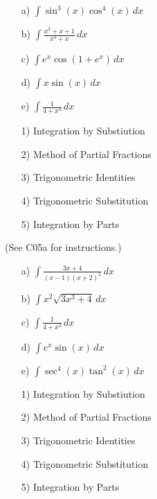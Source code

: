\documentclass[12pt]{article}
\begin{document}
\vspace{1em}

\begin{multicols}{2}
  \begin{itemize}
    \item[a)] \(\displaystyle\int \sin^3(x)\cos^4(x)\,dx\)
    \item[b)] \(\displaystyle\int \frac{x^2+x+1}{x^3+x}\,dx\)
    \item[c)] \(\displaystyle\int e^x\cos(1+e^x)\,dx\)
    \item[d)] \(\displaystyle\int x\sin(x)\,dx\)
    \item[e)] \(\displaystyle\int \frac{1}{4+x^2}\,dx\)
  \end{itemize}
  \columnbreak
  \begin{itemize}
    \item[1)] Integration by Substiution
    \item[2)] Method of Partial Fractions
    \item[3)] Trigonometric Identities
    \item[4)] Trigonometric Substitution
    \item[5)] Integration by Parts
  \end{itemize}
\end{multicols}

\newpage





(See C05a for instructions.)

\begin{multicols}{2}
  \begin{itemize}
    \item[a)] \(\displaystyle\int \frac{3x+4}{(x-1)(x+2)^2}\,dx\)
    \item[b)] \(\displaystyle\int x^2\sqrt{3x^3+4}\,dx\)
    \item[c)] \(\displaystyle\int \frac{1}{4+x^2}\,dx\)
    \item[d)] \(\displaystyle\int e^x\sin(x)\,dx\)
    \item[e)] \(\displaystyle\int \sec^4(x)\tan^2(x)\,dx\)
  \end{itemize}
  \columnbreak
  \begin{itemize}
    \item[1)] Integration by Substiution
    \item[2)] Method of Partial Fractions
    \item[3)] Trigonometric Identities
    \item[4)] Trigonometric Substitution
    \item[5)] Integration by Parts
  \end{itemize}
\end{multicols}
\end{document}
